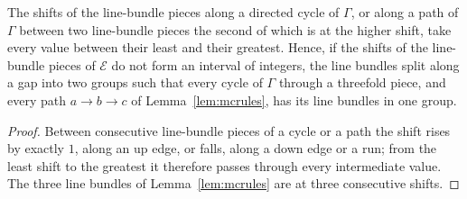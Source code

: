 \begin{lemma}\label{lem:interval}
The shifts of the line-bundle pieces along a directed cycle of $\Gamma$, or along a path of $\Gamma$ between two line-bundle pieces the second of which is at the higher shift, take every value between their least and their greatest. Hence, if the shifts of the line-bundle pieces of $\mathcal{E}$ do not form an interval of integers, the line bundles split along a gap into two groups such that every cycle of $\Gamma$ through a threefold piece, and every path $a\to b\to c$ of Lemma~\ref{lem:mcrules}, has its line bundles in one group.
\end{lemma}

\begin{proof}
Between consecutive line-bundle pieces of a cycle or a path the shift rises by exactly $1$, along an up edge, or falls, along a down edge or a run; from the least shift to the greatest it therefore passes through every intermediate value. The three line bundles of Lemma~\ref{lem:mcrules} are at three consecutive shifts.
\end{proof}


